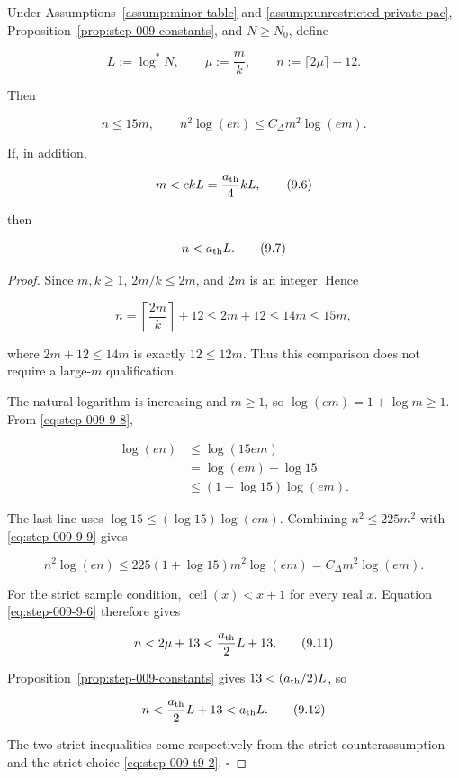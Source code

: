 \begin{lemma}
\label{lem:step-009-arithmetic}
Under Assumptions~\ref{assump:minor-table} and
\ref{assump:unrestricted-private-pac},
Proposition~\ref{prop:step-009-constants}, and \(N\ge N_0\), define

\[
L:=\log^*N,
\qquad
\mu:=\frac{m}{k},
\qquad
n:=\lceil2\mu\rceil+12.
\tag{9.4}\label{eq:step-009-9-4}
\]

Then

\[
n\le15m,
\qquad
n^2\log(en)\le C_\Delta m^2\log(em).
\tag{9.5}\label{eq:step-009-9-5}
\]

If, in addition,

\[
m<c kL=\frac{a_{\rm th}}4kL,
\tag{9.6}\label{eq:step-009-9-6}
\]

then

\[
n<a_{\rm th}L.
\tag{9.7}\label{eq:step-009-9-7}
\]

\end{lemma}

\begin{proof}
Since \(m,k\ge1\), \(2m/k\le2m\), and \(2m\) is an integer.  Hence

\[
n=\left\lceil\frac{2m}{k}\right\rceil+12
\le2m+12
\le14m
\le15m,
\tag{9.8}\label{eq:step-009-9-8}
\]

where \(2m+12\le14m\) is exactly \(12\le12m\).  Thus this comparison
does not require a large-\(m\) qualification.

The natural logarithm is increasing and \(m\ge1\), so
\(\log(em)=1+\log m\ge 1\).  From \eqref{eq:step-009-9-8},

\[
\begin{aligned}
\log(en)
&\le\log(15em)\\
&=\log(em)+\log15\\
&\le(1+\log15)\log(em).
\end{aligned}
\tag{9.9}\label{eq:step-009-9-9}
\]

The last line uses \(\log15\le (\log15)\log(em)\).  Combining
\(n^2\le225m^2\) with \eqref{eq:step-009-9-9} gives

\[
n^2\log(en)
\le225(1+\log15)m^2\log(em)
=C_\Delta m^2\log(em).
\tag{9.10}\label{eq:step-009-9-10}
\]

For the strict sample condition, \(\operatorname{ceil}(x)<x+1\) for every real
\(x\).  Equation \eqref{eq:step-009-9-6} therefore gives

\[
n<2\mu+13
<\frac{a_{\rm th}}2L+13.
\tag{9.11}\label{eq:step-009-9-11}
\]

Proposition~\ref{prop:step-009-constants} gives
\(13<(a_{\rm th}/2)L\), so

\[
n
<\frac{a_{\rm th}}2L+13
<a_{\rm th}L.
\tag{9.12}\label{eq:step-009-9-12}
\]

The two strict inequalities come respectively from the strict
counterassumption and the strict choice \eqref{eq:step-009-t9-2}.  \(\square\)

\end{proof}


